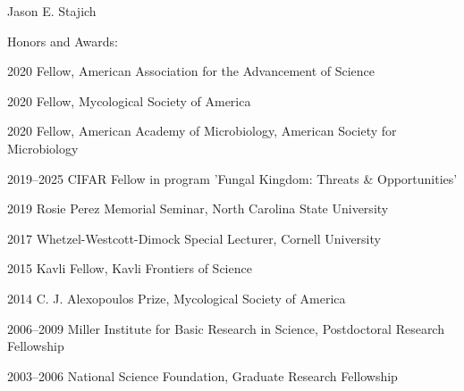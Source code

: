 \documentclass[10pt]{article}
\def\endthebibliography{\end{etaremune}}
\newlength{\oldcvlabelwidth}
\begin{document}
\begin{cv}{\centerline{Jason E. Stajich}}
\begin{cvlistcompact}{Honors and Awards:}
\item [2020] Fellow, American Association for the Advancement of Science
\item [2020] Fellow, Mycological Society of America
\item [2020] Fellow, American Academy of Microbiology, American
  Society for Microbiology
\item [2019--2025] CIFAR Fellow in program 'Fungal Kingdom: Threats \& Opportunities'
\item [2019] Rosie Perez Memorial Seminar, North Carolina State University
\item [2017] Whetzel-Westcott-Dimock Special Lecturer, Cornell University
\item [2015] Kavli Fellow, Kavli Frontiers of Science
\item [2014] C. J. Alexopoulos Prize, Mycological Society of America
\item [2006--2009] Miller Institute for Basic Research in Science,
  Postdoctoral Research Fellowship
\item [2003--2006] National Science Foundation, Graduate Research Fellowship
\end{cvlistcompact}

\setlength{\oldcvlabelwidth}{\cvlabelwidth}
\setlength{\cvlabelwidth}{1em}
\renewcommand*{\bibindent}{1.5em}
\renewcommand*{\biblabelsep}{1.5em}


\makeatletter
\def\thebibliography#1{\list
{\arabic{enumiv}.}{\settowidth\labelwidth{[#1]}\leftmargin\labelwidth
\advance\leftmargin\labelsep
\usecounter{enumiv}}
\def\newblock{\hskip .11em plus .33em minus .07em}
\sloppy\clubpenalty4000\widowpenalty4000
\sfcode`\.=1000\relax
}
\let\endthebibliography=\endlist
\makeatother


\end{cv}
\end{document}
